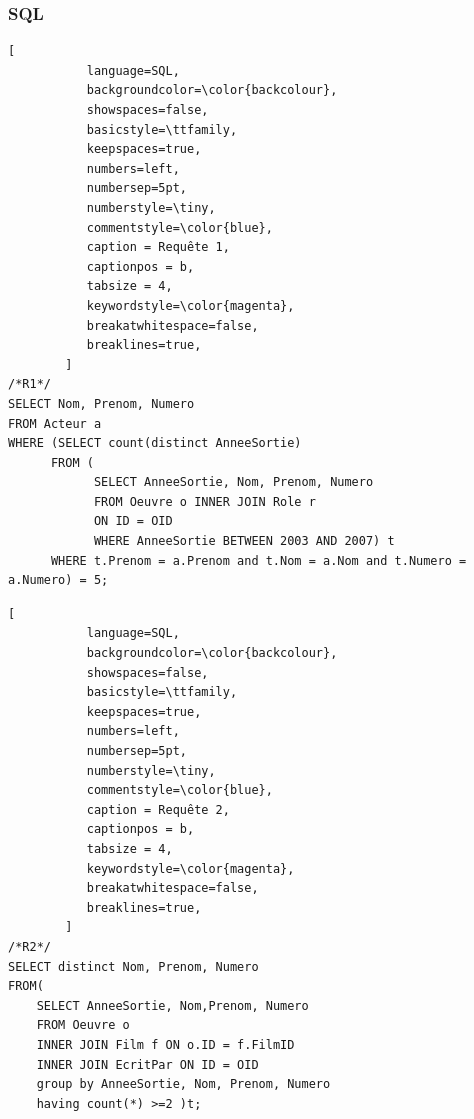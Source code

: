 \documentclass[10pt,a4paper]{article}
\begin{document}
\subsubsection{SQL}
\begin{lstlisting}[
           language=SQL,
           backgroundcolor=\color{backcolour},
           showspaces=false,
           basicstyle=\ttfamily,
           keepspaces=true,                 
           numbers=left,                    
           numbersep=5pt,
           numberstyle=\tiny,
           commentstyle=\color{blue},
           caption = Requête 1,
           captionpos = b, 
           tabsize = 4,
           keywordstyle=\color{magenta},
           breakatwhitespace=false,         
           breaklines=true,
        ]
/*R1*/
SELECT Nom, Prenom, Numero
FROM Acteur a
WHERE (SELECT count(distinct AnneeSortie)
      FROM (
			SELECT AnneeSortie, Nom, Prenom, Numero
			FROM Oeuvre o INNER JOIN Role r
			ON ID = OID
	  		WHERE AnneeSortie BETWEEN 2003 AND 2007) t
	  WHERE t.Prenom = a.Prenom and t.Nom = a.Nom and t.Numero = a.Numero) = 5;
\end{lstlisting}
\begin{lstlisting}[
           language=SQL,
           backgroundcolor=\color{backcolour},
           showspaces=false,
           basicstyle=\ttfamily,
           keepspaces=true,                 
           numbers=left,                    
           numbersep=5pt,
           numberstyle=\tiny,
           commentstyle=\color{blue},
           caption = Requête 2,
           captionpos = b,
           tabsize = 4,
           keywordstyle=\color{magenta},
           breakatwhitespace=false,         
           breaklines=true,
        ]
/*R2*/
SELECT distinct Nom, Prenom, Numero
FROM(
	SELECT AnneeSortie, Nom,Prenom, Numero
	FROM Oeuvre o
	INNER JOIN Film f ON o.ID = f.FilmID
	INNER JOIN EcritPar ON ID = OID
	group by AnneeSortie, Nom, Prenom, Numero
	having count(*) >=2 )t;
\end{lstlisting}
\end{document}
